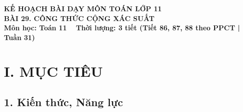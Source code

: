 \documentclass[12pt, a4paper]{article}
\begin{document}
\begin{center}
    {\fontsize{14pt}{17pt}\selectfont \textbf{KẾ HOẠCH BÀI DẠY MÔN TOÁN LỚP 11}}\\[6pt]
    {\fontsize{16pt}{19pt}\selectfont \textbf{BÀI 29. CÔNG THỨC CỘNG XÁC SUẤT}}\\[4pt]
    {\fontsize{12pt}{15pt}\selectfont \textbf{Môn học: Toán 11} \ \textbar \ \textbf{Thời lượng: 3 tiết (Tiết 86, 87, 88 theo PPCT | Tuần 31)}}
\end{center}

\vspace{5pt}

\section*{I. MỤC TIÊU}

\subsection*{1. Kiến thức, Năng lực}
\end{document}
